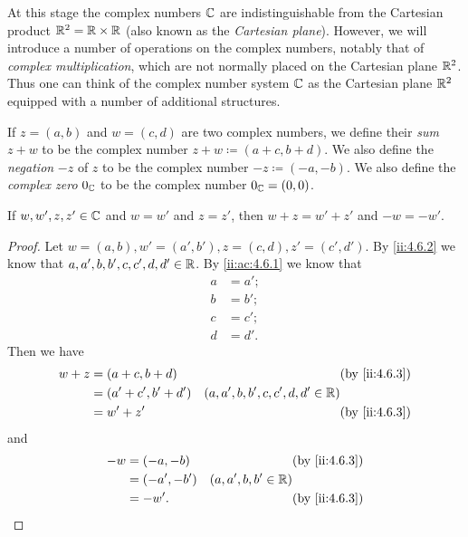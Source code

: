 \begin{note}
  At this stage the complex numbers \(\mathbb{C}\) are indistinguishable from the Cartesian product \(\mathbb{R}^2 = \mathbb{R} \times \mathbb{R}\)
  (also known as the \emph{Cartesian plane}).
  However, we will introduce a number of operations on the complex numbers, notably that of \emph{complex multiplication}, which are not normally placed on the Cartesian plane \(\mathbb{R}^2\).
  Thus one can think of the complex number system \(\mathbb{C}\) as the Cartesian plane \(\mathbb{R}^2\) equipped with a number of additional structures.
\end{note}

\begin{defn}\label{ii:4.6.3}
  If \(z = (a, b)\) and \(w = (c, d)\) are two complex numbers, we define their \emph{sum} \(z + w\) to be the complex number \(z + w \coloneqq (a + c, b + d)\).
  We also define the \emph{negation} \(-z\) of \(z\) to be the complex number \(-z \coloneqq (-a, -b)\).
  We also define the \emph{complex zero} \(0_{\mathbb{C}}\) to be the complex number \(0_{\mathbb{C}} = (0, 0)\).
\end{defn}

\begin{ac}\label{ii:ac:4.6.2}
  If \(w, w', z, z' \in \mathbb{C}\) and \(w = w'\) and \(z = z'\), then \(w + z = w' + z'\) and \(-w = -w'\).
\end{ac}

\begin{proof}
  Let \(w = (a, b), w' = (a', b'), z = (c, d), z' = (c', d')\).
  By \cref{ii:4.6.2} we know that \(a, a', b, b', c, c', d, d' \in \mathbb{R}\).
  By \cref{ii:ac:4.6.1} we know that
  \begin{align*}
    a & = a'; \\
    b & = b'; \\
    c & = c'; \\
    d & = d'.
  \end{align*}
  Then we have
  \begin{align*}
    w + z & = (a + c, b + d)     &                                     & \by{ii:4.6.3} \\
          & = (a' + c', b' + d') & (a, a', b, b', c, c', d, d' \in \R)                 \\
          & = w' + z'            &                                     & \by{ii:4.6.3}
  \end{align*}
  and
  \begin{align*}
    -w & = (-a, -b)   &                       & \by{ii:4.6.3} \\
       & = (-a', -b') & (a, a', b, b' \in \R)                 \\
       & = -w'.       &                       & \by{ii:4.6.3}
  \end{align*}
\end{proof}

